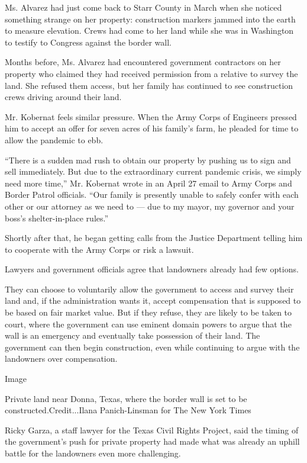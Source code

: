 Ms. Alvarez had just come back to Starr County in March when she noticed
something strange on her property: construction markers jammed into the
earth to measure elevation. Crews had come to her land while she was in
Washington to testify to Congress against the border wall.

Months before, Ms. Alvarez had encountered government contractors on her
property who claimed they had received permission from a relative to
survey the land. She refused them access, but her family has continued
to see construction crews driving around their land.

Mr. Kobernat feels similar pressure. When the Army Corps of Engineers
pressed him to accept an offer for seven acres of his family's farm, he
pleaded for time to allow the pandemic to ebb.

``There is a sudden mad rush to obtain our property by pushing us to
sign and sell immediately. But due to the extraordinary current pandemic
crisis, we simply need more time,'' Mr. Kobernat wrote in an April 27
email to Army Corps and Border Patrol officials. ``Our family is
presently unable to safely confer with each other or our attorney as we
need to --- due to my mayor, my governor and your boss's
shelter-in-place rules.''

Shortly after that, he began getting calls from the Justice Department
telling him to cooperate with the Army Corps or risk a lawsuit.

Lawyers and government officials agree that landowners already had few
options.

They can choose to voluntarily allow the government to access and survey
their land and, if the administration wants it, accept compensation that
is supposed to be based on fair market value. But if they refuse, they
are likely to be taken to court, where the government can use eminent
domain powers to argue that the wall is an emergency and eventually take
possession of their land. The government can then begin construction,
even while continuing to argue with the landowners over compensation.

Image

Private land near Donna, Texas, where the border wall is set to be
constructed.Credit...Ilana Panich-Linsman for The New York Times

Ricky Garza, a staff lawyer for the Texas Civil Rights Project, said the
timing of the government's push for private property had made what was
already an uphill battle for the landowners even more challenging.


